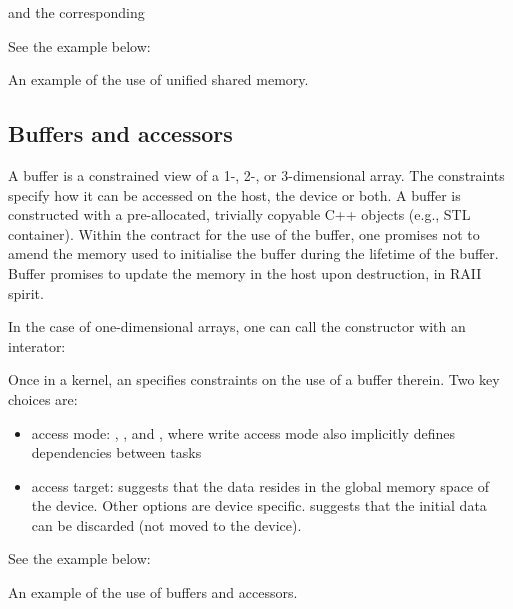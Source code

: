 and the corresponding 


See the example below:
\raggedbottom
\begin{codebox}[]{\href{https://godbolt.org/z/hc1f9Pnj5}{\ExternalLink}}
\footnotesize An example of the use of unified shared memory.
\tcblower
{}
\end{codebox}
 
\subsection{Buffers and accessors}

A buffer is a constrained view of a 1-, 2-, or 3-dimensional array.
The constraints specify how it can be accessed on the host, the device or both. 
A buffer is constructed with a pre-allocated, trivially copyable C++ objects (e.g., STL container). 
Within the contract for the use of the buffer, 
one promises not to amend the memory used to initialise the buffer during the lifetime of the buffer. 
Buffer promises to update the memory in the host upon destruction, in RAII spirit. 

In the case of one-dimensional arrays, one can call the constructor with an interator:

Once in a kernel, an  specifies constraints on the use of a buffer therein. 
Two key choices are:
\begin{itemize}
\item access mode: , , and , where write access mode also implicitly defines dependencies between tasks
\item access target:  suggests that the data resides in the global memory space of the device. Other options are device specific.  suggests that the initial data can be discarded (not moved to the device). 
\end{itemize}

See the example below:
\raggedbottom
\begin{codebox}[]{\href{https://godbolt.org/z/h1qqdbeMd}{\ExternalLink}}
\footnotesize An example of the use of buffers and accessors.
\tcblower
{}
\end{codebox}

